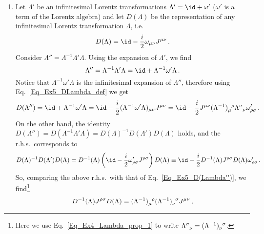 \begin{sol}
\begin{enumerate}[label=\alph*)]
        \item Let $\Lambda'$ be an infinitesimal Lorentz transformations $\Lambda' = \id + \omega'$ ($\omega'$ is a term of the Lorentz algebra) and let $D(\Lambda)$ be the representation of any infinitesimal Lorentz transformation $\Lambda$, i.e.
        \begin{equation}
            D(\Lambda) = \id - \frac{i}{2} \omega_{\mu \nu} J^{\mu \nu} \, .
            \label{Eq_Ex5_DLambda_def}
        \end{equation}
        Consider $\Lambda'' = \Lambda^{-1} \Lambda' \Lambda$. Using the expansion of $\Lambda'$, we find
        \begin{equation}
            \Lambda'' = \Lambda^{-1} \Lambda' \Lambda 
            = \id + \Lambda^{-1} \omega' \Lambda \, .
        \end{equation}
        Notice that $\Lambda^{-1} \omega' \Lambda$ is the infinitesimal expansion of $\Lambda''$, therefore using Eq.~\eqref{Eq_Ex5_DLambda_def} we get
        \begin{equation}
            D(\Lambda'') 
            = \id + \Lambda^{-1} \omega' \Lambda = \id - \frac{i}{2} (\Lambda^{-1} \omega' \Lambda)_{\mu\nu} J^{\mu\nu}
            = \id - \frac{i}{2} J^{\mu\nu} \tensor{(\Lambda^{-1})}{_\mu^\rho} \tensor{\Lambda}{^\sigma_\nu} \omega'_{\rho\sigma} \, .
            \label{Eq_Ex5_D(Lambda'')}
        \end{equation}
        On the other hand, the identity $D(\Lambda'') = D(\Lambda^{-1} \Lambda' \Lambda) = D(\Lambda)^{-1} D(\Lambda') D(\Lambda)$ holds, and the r.h.s.~corresponds to 
        \begin{equation}
            D(\Lambda)^{-1} D(\Lambda') D(\Lambda)
            = D^{-1}(\Lambda) \left(\id - \frac{i}{2} \omega'_{\rho \sigma} J^{\rho \sigma}\right) D(\Lambda)
            \equiv \id - \frac{i}{2} D^{-1}(\Lambda) J^{\rho\sigma} D(\Lambda)  \omega'_{\rho\sigma} \, .
        \end{equation}
        So, comparing the above r.h.s.~with that of Eq.~\eqref{Eq_Ex5_D(Lambda'')}, we find\footnote{Here we use Eq.~\eqref{Eq_Ex4_Lambda_prop_1} to write $\tensor{\Lambda}{^\sigma_\nu} = \tensor{(\Lambda^{-1})}{_\nu^\sigma}$.}
        \begin{equation}
            D^{-1}(\Lambda) J^{\rho\sigma} D(\Lambda) 
            = \tensor{(\Lambda^{-1})}{_\mu^\rho} \tensor{(\Lambda^{-1})}{_\nu^\sigma} J^{\mu\nu} \, ,
        \end{equation}

\end{enumerate}
\end{sol}
